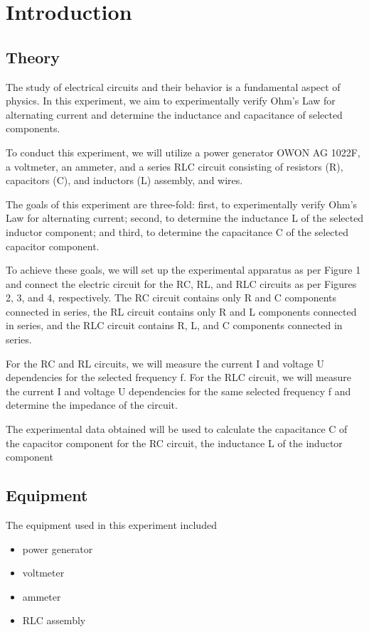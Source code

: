 \section{Introduction}

\subsection{Theory}
 
The study of electrical circuits and their behavior is a fundamental aspect of physics. In this experiment, we aim to experimentally verify Ohm's Law for alternating current and determine the inductance and capacitance of selected components. 

To conduct this experiment, we will utilize a power generator OWON AG 1022F, a voltmeter, an ammeter, and a series RLC circuit consisting of resistors (R), capacitors (C), and inductors (L) assembly, and wires. 

The goals of this experiment are three-fold: first, to experimentally verify Ohm's Law for alternating current; second, to determine the inductance L of the selected inductor component; and third, to determine the capacitance C of the selected capacitor component. 

To achieve these goals, we will set up the experimental apparatus as per Figure 1 and connect the electric circuit for the RC, RL, and RLC circuits as per Figures 2, 3, and 4, respectively. The RC circuit contains only R and C components connected in series, the RL circuit contains only R and L components connected in series, and the RLC circuit contains R, L, and C components connected in series. 

For the RC and RL circuits, we will measure the current I and voltage U dependencies for the selected frequency f. For the RLC circuit, we will measure the current I and voltage U dependencies for the same selected frequency f and determine the impedance of the circuit. 

The experimental data obtained will be used to calculate the capacitance C of the capacitor component for the RC circuit, the inductance L of the inductor component 

\subsection{Equipment}
The equipment used in this experiment included
\begin{itemize}
	\item power generator
	\item voltmeter
	\item ammeter
	\item RLC assembly
\end{itemize}
